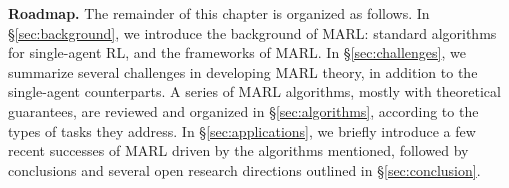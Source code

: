 
\vspace{8pt}
{\noindent \bf Roadmap.}
\vspace{2pt}
The remainder of this chapter is organized as follows. In \S\ref{sec:background}, we introduce the background of MARL: standard algorithms for single-agent RL, and  the  frameworks of MARL. In \S\ref{sec:challenges}, we summarize several challenges in developing MARL theory, in addition to the single-agent counterparts. A series of MARL algorithms, mostly with theoretical guarantees, are reviewed and organized in \S\ref{sec:algorithms},  according to the types of tasks they address. In \S\ref{sec:applications}, we briefly introduce a few recent successes of MARL driven by the algorithms mentioned, followed by conclusions and several open  research directions outlined in \S\ref{sec:conclusion}. 



